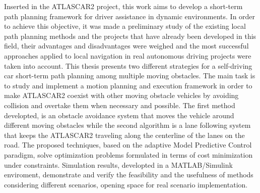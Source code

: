 Inserted in the ATLASCAR2 project, this work aims to develop a short-term path planning framework for driver assistance in dynamic environments. In order to achieve this objective, it was made a preliminary study of the existing local path planning methods and the projects that have already been developed in this field, their advantages and disadvantages were weighed and the most successful approaches applied to local navigation in real autonomous driving projects were taken into account.
This thesis presents two different strategies for a self-driving car short-term path planning among multiple moving obstacles. The main task is to study and implement a motion planning and execution framework in order to make ATLASCAR2 coexist with other moving obstacle vehicles by avoiding collision and overtake them when necessary and possible. The first method developted, is an obstacle avoidance system that moves the vehicle around different moving obstacles while the second algorithm is a lane following system that keeps the ATLASCAR2 traveling along the centerline of the lanes on the road. The proposed techniques, based on the adaptive Model Predictive Control paradigm, solve optimization problems formulated in terms of cost minimization under constraints. Simulation results, developted in a MATLAB/Simulink enviroment, demonstrate and verify the feasibility and the usefulness of methods considering different scenarios, opening space for real scenario implementation.
